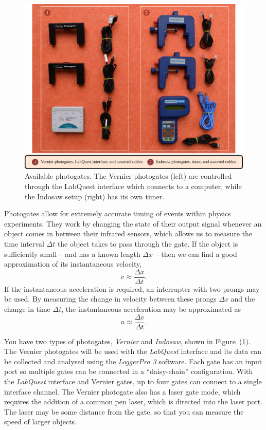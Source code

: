 \begin{figure}[!htb]
    \centering
    \includegraphics[width=\textwidth]{figs/airtrack/airtrack-photogates.jpg}
    \caption{Available photogates. The Vernier photogates (left) are controlled through the LabQuest interface which connects to a computer, while the Indosaw setup (right) has its own timer.}
    \label{fig:airtrack-photogates}
\end{figure}

Photogates allow for extremely accurate timing of events within physics experiments. They work by changing the state of their output signal whenever an object comes in between their infrared sensors, which allows us to measure the time interval $\Delta t$ the object takes to pass through the gate. If the object is sufficiently small -- and has a known length $\Delta x$ -- then we can find a good approximation of its instantaneous velocity,
\begin{equation}
    v \approx \frac{\Delta x}{\Delta t}.
\end{equation}
If the instantaneous acceleration is required, an interrupter with two prongs may be used. By measuring the change in velocity between these prongs $\Delta v$ and the change in time $\Delta t$, the instantaneous acceleration may be approximated as
\begin{equation}
    a \approx \frac{\Delta v}{\Delta t}.
\end{equation}

You have two types of photogates, \textsl{Vernier} and \textsl{Indosaw}, shown in Figure~(\ref{fig:airtrack-photogates}). The Vernier photogates will be used with the \textsl{LabQuest} interface and its data can be collected and analysed using the \textsl{LoggerPro 3} software. Each gate has an input port so multiple gates can be connected in a ``daisy-chain'' configuration. With the \textsl{LabQuest} interface and Vernier gates, up to four gates can connect to a single interface channel. The Vernier photogate also has a laser gate mode, which requires the addition of a common pen laser, which is directed into the laser port. The laser may be some distance from the gate, so that you can measure the speed of larger objects.



